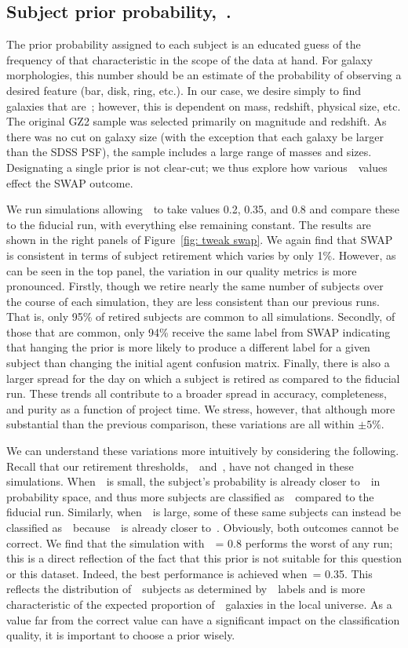 \subsection{Subject prior probability,~\p.}
The prior probability assigned to each subject is an educated guess of the frequency of that characteristic in the scope of the data at hand. For galaxy morphologies, this number should be an estimate of the probability of observing a desired feature (bar, disk, ring, etc.). In our case, we desire simply to find galaxies that are~\feat; however, this is dependent on mass, redshift, physical size, etc. The original GZ2 sample was selected primarily on magnitude and redshift.  As there was no cut on galaxy size (with the exception that each galaxy be larger than the SDSS PSF), the sample includes a large range of  masses and sizes. Designating a single prior is not clear-cut; we thus explore how various~\p~values effect the SWAP outcome.

We run simulations allowing~\p~to take values 0.2, 0.35, and 0.8 
and compare these to the fiducial run, with everything else remaining constant. The results are shown in the right panels of Figure~\ref{fig: tweak swap}. We again find that SWAP is consistent in terms of subject retirement which varies by only 1\%. However, as can be seen in the top panel, the variation in our quality metrics is more pronounced. Firstly, though we retire nearly the same number of subjects over the course of each simulation, they are less consistent than our previous runs. That is, only 95\% of retired subjects are common to all simulations. Secondly, of those that are common, only 94\% receive the same label from SWAP indicating that hanging the prior is more likely to produce a different label for a given subject than changing the initial agent confusion matrix. Finally, there is also a larger spread for the day on which a subject is retired as compared to the fiducial run. These trends all contribute to a broader spread in accuracy, completeness, and purity as a function of project time. We stress, however, that although more substantial than the previous comparison, these variations are all within $\pm5\%$. 

We can understand these variations more intuitively by considering the following. Recall that our retirement thresholds,~\tf~and~\tn, have not changed in these simulations. When~\p~is small, the subject's probability is already closer to~\tn~in probability space, and thus more subjects are classified as~\notfeat~compared to the fiducial run. Similarly, when~\p~is large, some of these same subjects can instead be classified as~\feat~because~\p~is already closer to~\tf. Obviously, both outcomes cannot be correct. We find that the simulation with~\p~= 0.8 performs the worst of any run; this is a direct reflection of the fact that this prior is not suitable for this question or this dataset. Indeed, the best performance is achieved when~\p = 0.35.  This reflects the distribution of~\feat~subjects as determined by~\raw~labels and is more characteristic of the expected proportion of~\feat~galaxies in the local universe. As a value far from the correct value can have a significant impact on the classification quality, it is important to choose a prior wisely.


